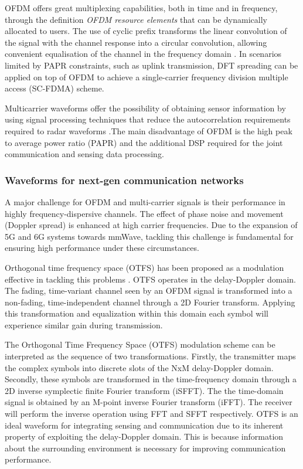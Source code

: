 	OFDM offers great multiplexing capabilities, both in time and in frequency, through the definition \textit{OFDM resource elements} that can be dynamically allocated to users. The use of cyclic prefix transforms the linear convolution of the signal with the channel response into a circular convolution, allowing convenient equalisation of the channel in the frequency domain \cite{Wild_Grudnitsky_Mandelli_Henninger_Guan_Schaich_2023}. In scenarios limited by PAPR constraints, such as uplink transmission, DFT spreading can  be applied on top of OFDM to achieve a single-carrier frequency division multiple access (SC-FDMA) scheme.
	
	Multicarrier waveforms offer the possibility of obtaining sensor information by using signal processing techniques that reduce the autocorrelation requirements required to radar waveforms \cite{Sturm_Wiesbeck_2011}.The main disadvantage of OFDM is the high peak to average power ratio (PAPR) and the additional DSP required for the joint communication and sensing data processing.
	
	\subsubsection{Waveforms for next-gen communication networks}
	
	A major challenge for OFDM and multi-carrier signals is their performance in highly frequency-dispersive channels. 
	The effect of phase noise and movement (Doppler spread) is enhanced at high carrier frequencies. 
	Due to the expansion of 5G and 6G systems towards mmWave, tackling this challenge is fundamental for ensuring high performance under these circumstances.
	
	Orthogonal time frequency space (OTFS) has been proposed as a modulation effective in tackling this problems \cite{OTFS_Hadani_2017}. OTFS operates in the delay-Doppler domain. 
	The fading, time-variant channel seen by an OFDM signal is transformed into a non-fading, time-independent channel through a 2D Fourier transform. 
	Applying this transformation and equalization within this domain each symbol will experience similar gain during transmission.
	
	The Orthogonal Time Frequency Space (OTFS) modulation scheme can be interpreted as the sequence of two transformations. 
	Firstly, the transmitter maps the complex symbols into discrete slots of the NxM delay-Doppler domain.
	Secondly, these symbols are transformed in the time-frequency domain through a 2D inverse symplectic finite Fourier transform (iSFFT). The the time-domain signal is obtained by an M-point inverse Fourier transform (iFFT). 
	The receiver will perform the inverse operation using FFT and SFFT respectively.
	OTFS is an ideal waveform for integrating sensing and communication due to its inherent property of exploiting the delay-Doppler domain.
	This is because information about the surrounding environment is necessary for improving communication performance.
	
